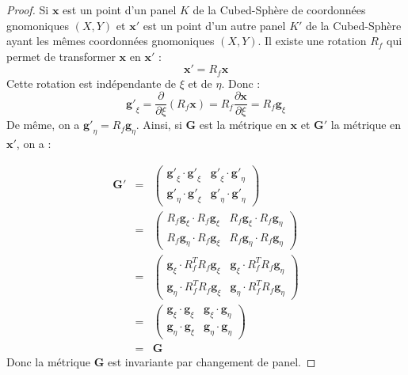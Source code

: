 \begin{proof}
Si $\mathbf{x}$ est un point d'un panel $K$ de la Cubed-Sphère de coordonnées gnomoniques $(X,Y)$ et $\mathbf{x}'$ est un point d'un autre panel $K'$ de la Cubed-Sphère ayant les mêmes coordonnées gnomoniques $(X,Y)$. Il existe une rotation $R_f$ qui permet de transformer $\mathbf{x}$ en $\mathbf{x}'$ :
\begin{equation}
\mathbf{x}' = R_f \mathbf{x}
\end{equation}
Cette rotation est indépendante de $\xi$ et de $\eta$. Donc :
\begin{equation}
\mathbf{g'}_{\xi} = \dfrac{\partial}{\partial \xi} \left( R_f \mathbf{x} \right) = R_f \dfrac{\partial \mathbf{x}}{\partial \xi}  = R_f \mathbf{g}_{\xi}
\end{equation}
De même, on a $\mathbf{g'}_{\eta} = R_f\mathbf{g}_{\eta}$.
Ainsi, si $\mathbf{G}$ est la métrique en $\mathbf{x}$ et $\mathbf{G}'$ la métrique en $\mathbf{x}'$, on a :

\begin{equation*}
\begin{array}{rcl}
\mathbf{G}' &=& \begin{pmatrix}
\mathbf{g'}_{\xi} \cdot \mathbf{g'}_{\xi} & \mathbf{g'}_{\xi} \cdot \mathbf{g'}_{\eta} \\
\mathbf{g'}_{\eta} \cdot \mathbf{g'}_{\xi} & \mathbf{g'}_{\eta} \cdot \mathbf{g'}_{\eta}
\end{pmatrix}\\
&=&
\begin{pmatrix}
R_f \mathbf{g}_{\xi} \cdot R_f \mathbf{g}_{\xi} & R_f \mathbf{g}_{\xi} \cdot R_f \mathbf{g}_{\eta} \\
R_f \mathbf{g}_{\eta} \cdot R_f \mathbf{g}_{\xi} & R_f \mathbf{g}_{\eta} \cdot R_f \mathbf{g}_{\eta}
\end{pmatrix}\\
&=&
\begin{pmatrix}
\mathbf{g}_{\xi} \cdot R_f^{T} R_f \mathbf{g}_{\xi} & \mathbf{g}_{\xi} \cdot  R_f^{T} R_f \mathbf{g}_{\eta} \\
\mathbf{g}_{\eta} \cdot  R_f^{T} R_f \mathbf{g}_{\xi} & \mathbf{g}_{\eta} \cdot  R_f^{T} R_f \mathbf{g}_{\eta}
\end{pmatrix}\\
&=& \begin{pmatrix}
\mathbf{g}_{\xi} \cdot \mathbf{g}_{\xi} & \mathbf{g}_{\xi} \cdot \mathbf{g}_{\eta} \\
\mathbf{g}_{\eta} \cdot \mathbf{g}_{\xi} & \mathbf{g}_{\eta} \cdot \mathbf{g}_{\eta}
\end{pmatrix}\\
& = & \mathbf{G}
\end{array}
\end{equation*}
Donc la métrique $\mathbf{G}$ est invariante par changement de panel.
\end{proof}

